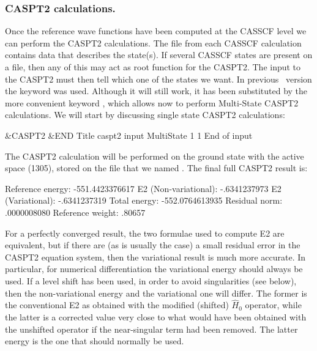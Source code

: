 \subsubsection{CASPT2 calculations.}
\label{TUT:sec:pt2out}


Once the reference wave functions have been computed at the CASSCF level
we can perform the CASPT2 calculations. The  file from
each CASSCF calculation contains data that describes the state(s).
If several CASSCF states are present on a  file, then any
of this may act as root function for the CASPT2. The input to the CASPT2
must then tell which one of the states we want. In previous \molcas\
version the keyword  was used. Although it will still
work, it has been substituted by the more convenient keyword ,
which allows now to perform Multi-State CASPT2 calculations. We will start
by discussing single state CASPT2 calculations:

\begin{inputlisting}
 &CASPT2 &END                                                                   
Title                                                                           
 caspt2 input                                                                    
MultiState
1 1
End of input                                                                    
\end{inputlisting}

The CASPT2 calculation will be performed on the ground state
with the active space (1305), stored on the  file that
we named \file{\$Project.11A1.JobIph}.
The final full CASPT2 result is:

\begin{sourcelisting}
      Reference energy:        -551.4423376617
      E2 (Non-variational):       -.6341237973
      E2 (Variational):           -.6341237319
      Total energy:            -552.0764613935
      Residual norm:               .0000008080
      Reference weight:            .80657
\end{sourcelisting}

For a perfectly converged result, the two formulae used to compute E2 are
equivalent, but if there are (as is usually the case) a small residual
error in the CASPT2 equation system, then the variational result is much
more accurate. In particular, for numerical differentiation the variational
energy should always be used. If a level shift has been used, in order to
avoid singularities (see below), then the non-variational energy and the
variational one will differ. The former is the conventional E2 as obtained
with the modified (shifted) $\hat{H}_0$ operator, while the latter is a
corrected value very close to what would have been obtained with the unshifted
operator if the near-singular term had been removed. The latter energy is
the one that should normally be used.

